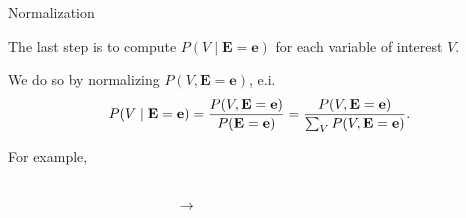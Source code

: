 \documentclass[10pt,usenames,dvipsnames]{beamer}
\begin{document}
\begin{frame}{Normalization}
  \centering
  {\footnotesize
    The last step is to compute $P(V \mid \bm{E=e})$ for each variable of interest
    $V$.

    We do so by normalizing $P(V, \bm{E=e})$, e.i.
    \[
      P(V \mid {\bf E=e}) = \frac{P(V, {\bf E=e})}{P({\bf E=e})} = \frac{P(V, {\bf E=e})}{\sum_{V} P(V, {\bf E=e})}.
    \]

    For example,
  }

  \begin{columns}

    \begin{column}{0.5\textwidth}
      \begin{table}
      \end{table}
    \end{column}

    \begin{column}{0.1\textwidth}
      $\rightarrow$
    \end{column}
    
    \begin{column}{0.5\textwidth}
      \begin{table}
      \end{table}
    \end{column}

  \end{columns}

\end{frame}
\end{document}
